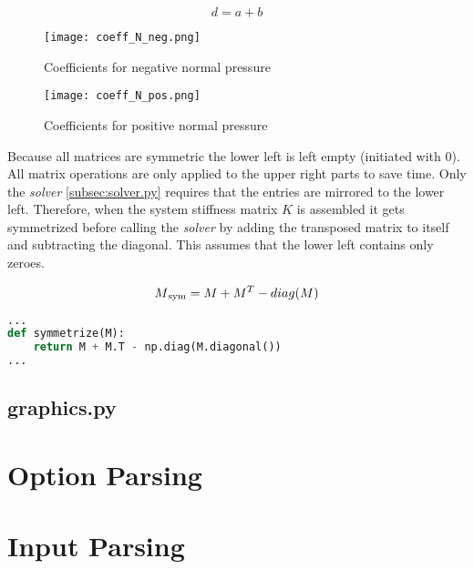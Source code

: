 \begin{equation} \label{d}
    d = a + b
\end{equation}

\begin{figure}[h]%
    \centering
    \texttt{[image: coeff\_N\_neg.png]}%
    \caption{Coefficients for negative normal pressure}%
    \label{fig:coeff_N_neg}%
\end{figure}

\begin{figure}[h]%
    \centering
    \texttt{[image: coeff\_N\_pos.png]}%
    \caption{Coefficients for positive normal pressure}%
    \label{fig:coeff_N_pos}%
\end{figure}

Because all matrices are symmetric the lower left is left empty (initiated with $0$). All matrix operations are only applied to the upper right parts to save time.
Only the \textit{solver} \ref{subsec:solver.py} requires that the entries are mirrored to the lower left. Therefore, when the system stiffness matrix $K$ is assembled it gets symmetrized before calling the \textit{solver} by adding the transposed matrix to itself and subtracting the diagonal.
This assumes that the lower left contains only zeroes.

\begin{equation} \label{symmetrize}
    M\textsubscript{sym} = M + M^T - diag(M)
\end{equation}


\begin{inconsolata}
\begin{lstlisting}[language=python]
...
def symmetrize(M):
    return M + M.T - np.diag(M.diagonal())
...
\end{lstlisting}
\end{inconsolata}


\subsection{graphics.py}
\label{subsec:graphics.py}


\pagebreak

\section{Option Parsing}
\label{sec:optparse}


\section{Input Parsing}
\label{sec:inputpars}

